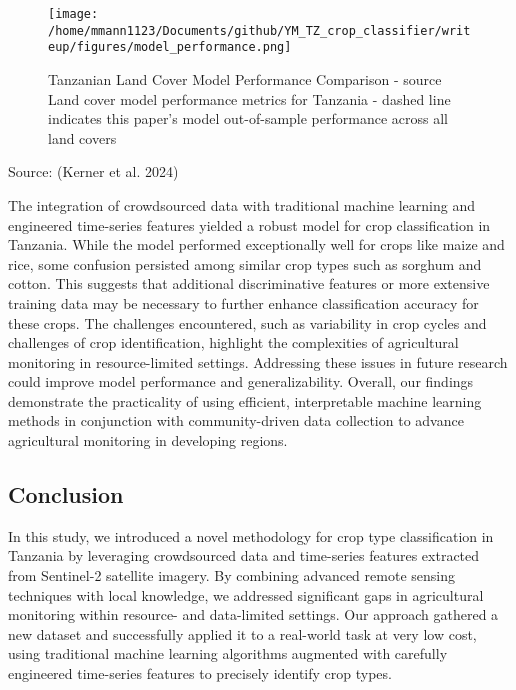 \documentclass[
  journal,
  twocolumn]{IEEEtran}
\begin{document}
\begin{figure}[H]
  \centering
  \texttt{[image: /home/mmann1123/Documents/github/YM\_TZ\_crop\_classifier/writeup/figures/model\_performance.png]}  
    \caption{Tanzanian Land Cover Model Performance Comparison - source  \newline Land cover model performance metrics for Tanzania - dashed line indicates this paper’s model out-of-sample performance across all land covers}
    \label{fig:model_compare} %
\end{figure}

Source: (Kerner et al. 2024)

The integration of crowdsourced data with traditional machine learning
and engineered time-series features yielded a robust model for crop
classification in Tanzania. While the model performed exceptionally well
for crops like maize and rice, some confusion persisted among similar
crop types such as sorghum and cotton. This suggests that additional
discriminative features or more extensive training data may be necessary
to further enhance classification accuracy for these crops. The
challenges encountered, such as variability in crop cycles and
challenges of crop identification, highlight the complexities of
agricultural monitoring in resource-limited settings. Addressing these
issues in future research could improve model performance and
generalizability. Overall, our findings demonstrate the practicality of
using efficient, interpretable machine learning methods in conjunction
with community-driven data collection to advance agricultural monitoring
in developing regions.

\hypertarget{conclusion}{%
\subsection{Conclusion}\label{conclusion}}

In this study, we introduced a novel methodology for crop type
classification in Tanzania by leveraging crowdsourced data and
time-series features extracted from Sentinel-2 satellite imagery. By
combining advanced remote sensing techniques with local knowledge, we
addressed significant gaps in agricultural monitoring within resource-
and data-limited settings. Our approach gathered a new dataset and
successfully applied it to a real-world task at very low cost, using
traditional machine learning algorithms augmented with carefully
engineered time-series features to precisely identify crop types.
\end{document}

